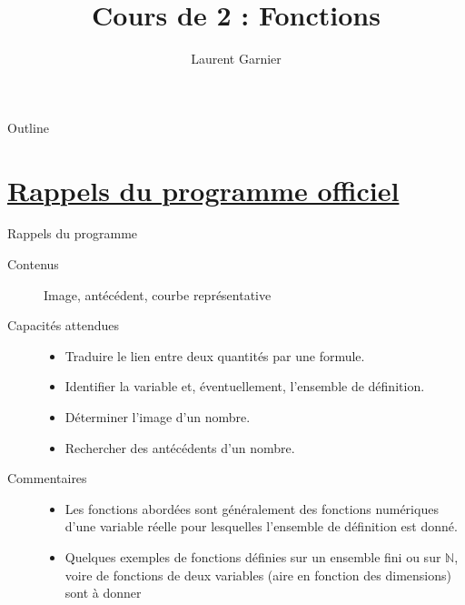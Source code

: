\documentclass[presentation]{beamer}
\author{Laurent Garnier}
\date{}
\title{Cours de 2\up{de} : Fonctions}
\newcommand{\E}[1]{\ensuremath{\mathbb{#1}}}
\begin{document}
\maketitle
\begin{frame}{Outline}
\tableofcontents
\end{frame}



\section{\href{http://cache.media.education.gouv.fr/file/30/52/3/programme\_mathematiques\_seconde\_65523.pdf}{Rappels du programme officiel}}
\label{sec:org6e4f36d}
\begin{frame}[label={sec:org2c095bc}]{Rappels du programme}
\begin{description}
\item[{Contenus}] Image, antécédent, courbe représentative
\item[{Capacités attendues}] \begin{itemize}
\item Traduire le lien entre deux quantités par une formule.
\item Identifier la variable et, éventuellement, l'ensemble de
définition.
\item Déterminer l'image d'un nombre.
\item Rechercher des antécédents d'un nombre.
\end{itemize}
\item[{Commentaires}] \begin{itemize}
\item Les fonctions abordées sont généralement des fonctions
numériques d'une variable réelle pour lesquelles l'ensemble
de définition est donné.
\item Quelques exemples de fonctions définies sur un ensemble
fini ou sur \E{N}, voire de fonctions de deux variables (aire
en fonction des dimensions) sont à donner
\end{itemize}
\end{description}
\end{frame}
\end{document}
